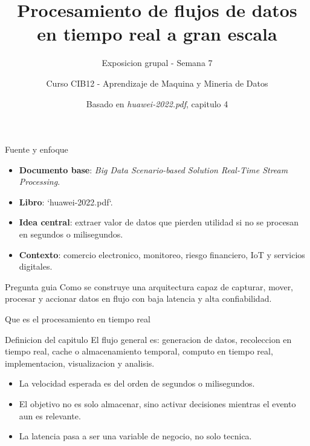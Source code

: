 \documentclass[aspectratio=169]{beamer}
\title{Procesamiento de flujos de datos en tiempo real a gran escala}
\subtitle{Exposicion grupal - Semana 7}
\author{Curso CIB12 - Aprendizaje de Maquina y Mineria de Datos}
\institute{Grupo 6}
\date{Basado en \textit{huawei-2022.pdf}, capitulo 4}
\begin{document}
\begin{frame}
  \titlepage
\end{frame}

\begin{frame}{Fuente y enfoque}
  \begin{itemize}
    \item \textbf{Documento base}: \textit{Big Data Scenario-based Solution Real-Time Stream Processing}.
    \item \textbf{Libro}: `huawei-2022.pdf`.
    \item \textbf{Idea central}: extraer valor de datos que pierden utilidad si no se procesan en segundos o milisegundos.
    \item \textbf{Contexto}: comercio electronico, monitoreo, riesgo financiero, IoT y servicios digitales.
  \end{itemize}
  \vspace{0.2cm}
  \begin{block}{Pregunta guia}
    Como se construye una arquitectura capaz de capturar, mover, procesar y accionar datos en flujo con baja latencia y alta confiabilidad.
  \end{block}
\end{frame}

\begin{frame}{Que es el procesamiento en tiempo real}
  \begin{block}{Definicion del capitulo}
    El flujo general es: generacion de datos, recoleccion en tiempo real, cache o almacenamiento temporal, computo en tiempo real, implementacion, visualizacion y analisis.
  \end{block}
  \begin{itemize}
    \item La velocidad esperada es del orden de segundos o milisegundos.
    \item El objetivo no es solo almacenar, sino activar decisiones mientras el evento aun es relevante.
    \item La latencia pasa a ser una variable de negocio, no solo tecnica.
  \end{itemize}
\end{frame}
\end{document}
